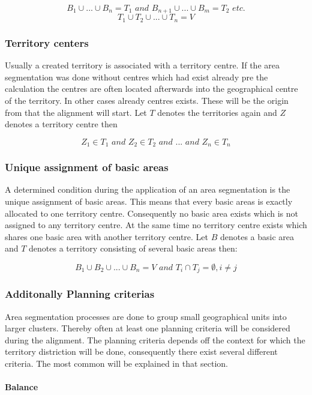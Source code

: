 \[ \mathit{B_{1} \cup  ... \cup B_{n}=T_{1} \text{ and } B_{n+1} \cup ... \cup B_{m}=T_{2} \text{ etc.}}\]
\[ \mathit{T_{1} \cup  T_{2} \cup ... \cup T_{n}=V}\]

\subsubsection{Territory centers}
Usually a created territory is associated with a territory centre. If the area segmentation was done without centres which had exist already pre the 
calculation the centres are often located afterwards into the geographical centre of the territory. In other cases already centres exists. These will be the origin from that the alignment will start. Let $ T $ denotes the territories again and $ Z $ denotes a territory centre then

\[ \mathit{Z_{1} \in T_{1} \text{ and } Z_{2} \in T_{2} \text{ and } ... \text{ and } Z_{n} \in T_{n}}\]

\subsubsection{Unique assignment of basic areas}
A determined condition during the application of an area segmentation is the unique assignment of basic areas. This means that every basic areas is exactly allocated to one territory centre. Consequently no basic area exists which is not assigned to any territory centre. At the same time no territory centre exists which shares one basic area with another territory centre. Let $ B $ denotes a basic area and $ T $ denotes a territory consisting of several basic areas then:

\[ \mathit{B_{1} \cup B_{2} \cup ... \cup B_{n}=V \text{ and } T_{i} \cap T_{j}  =\emptyset, i \neq j}\]


\subsubsection{Additonally Planning criterias}\label{criterias}
Area segmentation processes are done to group small geographical units into larger clusters. Thereby often at least one planning criteria will be considered during the alignment. The planning criteria depends off the context for which the territory distriction will be done, consequently there exist several different criteria. The most common will be explained in that section.

\paragraph{Balance}\mbox{} \\

